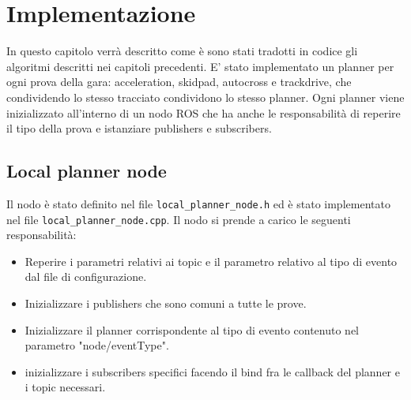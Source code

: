 \chapter{Implementazione}
In questo capitolo verrà descritto come è sono stati tradotti in codice gli algoritmi descritti nei capitoli precedenti.
E' stato implementato un planner per ogni prova della gara: acceleration, skidpad, autocross e trackdrive, che condividendo lo stesso tracciato condividono lo stesso planner. 
Ogni planner viene inizializzato all'interno di un nodo ROS che ha anche le responsabilità di reperire il tipo della prova e istanziare  publishers e subscribers.
\section{Local planner node}
Il nodo è stato definito nel file \texttt{local\_planner\_node.h} ed è stato implementato nel file \texttt{local\_planner\_node.cpp}. Il nodo si prende a carico le seguenti responsabilità:
\begin{itemize}
	\item Reperire i parametri relativi ai topic e il parametro relativo al tipo di evento dal file di configurazione.
	\item Inizializzare i publishers che sono comuni a tutte le prove.
	\item Inizializzare il planner corrispondente al tipo di evento contenuto nel parametro "node/eventType". 
	\item inizializzare i subscribers specifici facendo il bind fra le callback del planner e i topic necessari.
\end{itemize} 